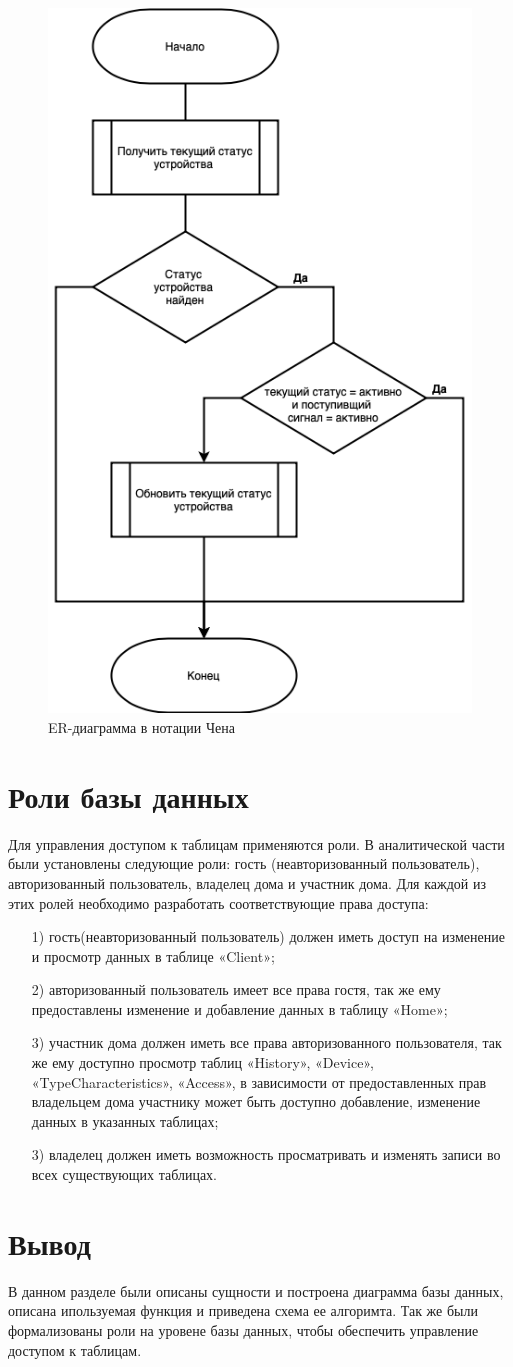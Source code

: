 \begin{figure}[h]
    \includegraphics[width=0.6\linewidth]{img/updatestatusfunc.png}
    \caption{ER-диаграмма в нотации Чена}
    \label{pic:func1}
\end{figure}
\noindent
\clearpage

\section{Роли базы данных}

Для управления доступом к таблицам применяются роли. 
В аналитической части были установлены следующие роли: 
гость (неавторизованный пользователь), авторизованный 
пользователь, владелец дома и участник дома. 
Для каждой из этих ролей необходимо разработать 
соответствующие права доступа:
\begin{enumerate}
    \item[1)] гость(неавторизованный пользователь) должен
    иметь доступ на изменение и просмотр данных в таблице «Client»;
    \item[2)] авторизованный пользователь имеет все права
    гостя, так же ему предоставлены изменение и добавление данных
    в таблицу «Home»;
    \item[3)] участник дома должен иметь все права авторизованного 
    пользователя, так же ему доступно просмотр таблиц
    «History», «Device», «TypeCharacteristics», «Access», в зависимости
    от предоставленных прав владельцем дома участнику может быть
    доступно добавление, изменение данных в указанных таблицах;
    \item[3)] владелец должен иметь возможность 
    просматривать и изменять записи во всех существующих таблицах.
\end{enumerate}

\section*{Вывод}

В данном разделе были описаны сущности и построена диаграмма
базы данных, описана ипользуемая функция и приведена схема ее алгоримта.
Так же были формализованы роли на уровене базы
данных, чтобы обеспечить управление доступом к таблицам.
